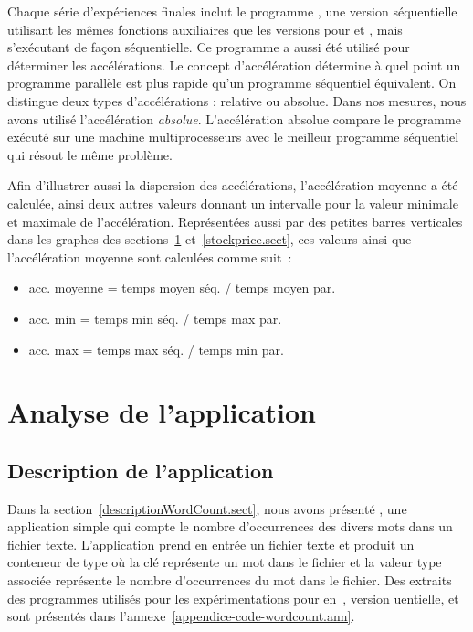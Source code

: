 Chaque s\'erie d'exp\'eriences finales inclut le programme , une version s\'equentielle utilisant les m\^emes fonctions auxiliaires que les versions pour  et , mais s'ex\'ecutant de fa\c{c}on s\'equentielle. Ce programme a aussi \'et\'e utilis\'e pour d\'eterminer les acc\'el\'erations. Le concept d'acc\'el\'eration d\'etermine \`a quel point un programme parall\`ele est plus rapide qu'un programme s\'equentiel \'equivalent. On distingue deux types d'acc\'elérations : relative ou absolue. Dans nos mesures, nous avons utilis\'e l'acc\'el\'eration \emph{absolue}. L'acc\'el\'eration absolue compare le programme ex\'ecut\'e sur une machine multiprocesseurs avec le meilleur programme s\'equentiel qui r\'esout le m\^eme probl\`eme. 

Afin d'illustrer aussi la dispersion des acc\'el\'erations, l'accélération moyenne a été calculée, ainsi deux autres valeurs donnant un intervalle pour la valeur minimale et maximale de l'acc\'el\'eration. Repr\'esent\'ees aussi par des petites barres verticales dans les graphes des sections~\ref{wordcount.sect} et~\ref{stockprice.sect}, ces valeurs ainsi que l'accélération moyenne sont calcul\'ees comme suit~: 

\begin{itemize}
\item acc. moyenne  =  temps moyen séq. / temps moyen par.
\item acc. min  =  temps min séq. / temps max par.
\item acc. max = temps max séq. / temps min par.
\end{itemize}

\section{Analyse de l'application }
\label{wordcount.sect}



\subsection{Description de l'application }

Dans la section~\ref{descriptionWordCount.sect}, nous avons pr\'esent\'e , une application simple qui compte le nombre d'occurrences des divers mots dans un fichier texte. L'application prend en entr\'ee un fichier texte et produit un conteneur de type  où la cl\'e repr\'esente un mot dans le fichier et la valeur  type   associ\'ee repr\'esente le nombre d'occurrences du mot dans le fichier. Des extraits des programmes utilis\'es pour les exp\'erimentations pour  en~,  version uentielle,  et  sont pr\'esent\'es dans l'annexe~\ref{appendice-code-wordcount.ann}.

